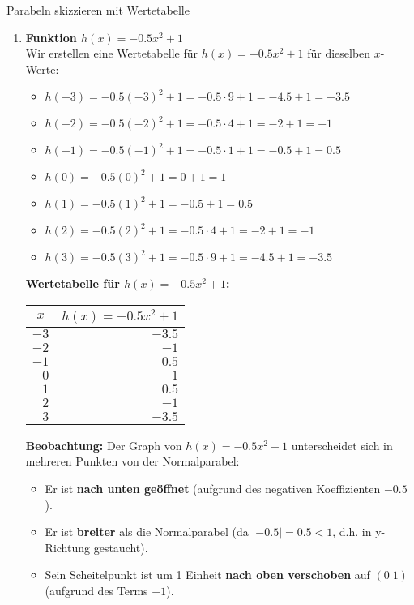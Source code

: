 \begin{loesungsumgebung}{Parabeln skizzieren mit Wertetabelle}
\begin{enumerate}[label=(\alph*)]
    \item \textbf{Funktion $h(x)=-0.5x^2+1$} \\
    Wir erstellen eine Wertetabelle für $h(x)=-0.5x^2+1$ für dieselben $x$-Werte:
    \begin{itemize}
        \item $h(-3) = -0.5(-3)^2 + 1 = -0.5 \cdot 9 + 1 = -4.5 + 1 = -3.5$
        \item $h(-2) = -0.5(-2)^2 + 1 = -0.5 \cdot 4 + 1 = -2 + 1 = -1$
        \item $h(-1) = -0.5(-1)^2 + 1 = -0.5 \cdot 1 + 1 = -0.5 + 1 = 0.5$
        \item $h(0) = -0.5(0)^2 + 1 = 0 + 1 = 1$
        \item $h(1) = -0.5(1)^2 + 1 = -0.5 + 1 = 0.5$
        \item $h(2) = -0.5(2)^2 + 1 = -0.5 \cdot 4 + 1 = -2 + 1 = -1$
        \item $h(3) = -0.5(3)^2 + 1 = -0.5 \cdot 9 + 1 = -4.5 + 1 = -3.5$
    \end{itemize}
    \textbf{Wertetabelle für $h(x)=-0.5x^2+1$:}
    \begin{center}
    \begin{tabular}{r r}
    \toprule
    \multicolumn{1}{c}{$x$} & \multicolumn{1}{c}{$h(x)=-0.5x^2+1$} \\
    \midrule
    $-3$ & $-3.5$ \\
    $-2$ & $-1$ \\
    $-1$ & $0.5$ \\
    $0$ & $1$ \\
    $1$ & $0.5$ \\
    $2$ & $-1$ \\
    $3$ & $-3.5$ \\
    \bottomrule
    \end{tabular}
    \end{center}
    \textbf{Beobachtung:}
    Der Graph von $h(x)=-0.5x^2+1$ unterscheidet sich in mehreren Punkten von der Normalparabel:
    \begin{itemize}
        \item Er ist \textbf{nach unten geöffnet} (aufgrund des negativen Koeffizienten $-0.5$).
        \item Er ist \textbf{breiter} als die Normalparabel (da $|-0.5|=0.5 < 1$, d.h. in y-Richtung gestaucht).
        \item Sein Scheitelpunkt ist um 1 Einheit \textbf{nach oben verschoben} auf $(0|1)$ (aufgrund des Terms $+1$).
    \end{itemize}
\end{enumerate}


\end{loesungsumgebung}
